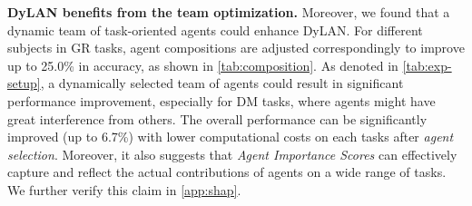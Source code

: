 \documentclass{article} %
\begin{document}
\noindent
\textbf{DyLAN benefits from the team optimization.}
Moreover, we found that a dynamic team of task-oriented agents could enhance DyLAN.
For different subjects in GR tasks, agent compositions are adjusted correspondingly to improve up to \textcolor{mydarkgreen}{25.0\%} in accuracy, as shown in \cref{tab:composition}. As denoted in \cref{tab:exp-setup}, a dynamically selected team of agents could result in significant performance improvement, especially for DM tasks, where agents might have great interference from others. The overall performance can be significantly improved (up to \textcolor{mydarkgreen}{6.7\%}) with lower computational costs on each tasks after \textit{agent selection}.
Moreover, it also suggests that \textit{Agent Importance Scores} can effectively capture and reflect the actual contributions of agents on a wide range of tasks. We further verify this claim in \cref{app:shap}. 
\end{document}
